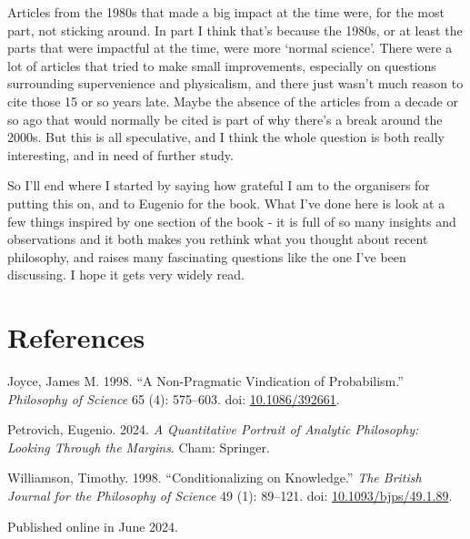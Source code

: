 \documentclass[
  11pt,
  letterpaper,
  DIV=11,
  numbers=noendperiod,
  twoside]{scrartcl}
\newlength{\cslhangindent}
\newenvironment{CSLReferences}[2] %
 {\begin{list}{}{%
  \setlength{\itemindent}{0pt}
  \setlength{\leftmargin}{0pt}
  \setlength{\parsep}{0pt}
  \ifodd #1
   \setlength{\leftmargin}{\cslhangindent}
   \setlength{\itemindent}{-1\cslhangindent}
  \fi
  \setlength{\itemsep}{#2\baselineskip}}}
 {\end{list}}
\begin{document}
\begin{longtable}[]{@{}
  >{\raggedright\arraybackslash}p{}
  >{\raggedleft\arraybackslash}p{}@{}}
\end{longtable}

Articles from the 1980s that made a big impact at the time were, for the
most part, not sticking around. In part I think that's because the
1980s, or at least the parts that were impactful at the time, were more
`normal science'. There were a lot of articles that tried to make small
improvements, especially on questions surrounding supervenience and
physicalism, and there just wasn't much reason to cite those 15 or so
years late. Maybe the absence of the articles from a decade or so ago
that would normally be cited is part of why there's a break around the
2000s. But this is all speculative, and I think the whole question is
both really interesting, and in need of further study.

So I'll end where I started by saying how grateful I am to the
organisers for putting this on, and to Eugenio for the book. What I've
done here is look at a few things inspired by one section of the book -
it is full of so many insights and observations and it both makes you
rethink what you thought about recent philosophy, and raises many
fascinating questions like the one I've been discussing. I hope it gets
very widely read.

\section*{References}\label{references}

\label{refs}
\begin{CSLReferences}{1}{0}
Joyce, James M. 1998. {``A Non-Pragmatic Vindication of Probabilism.''}
\emph{Philosophy of Science} 65 (4): 575--603. doi:
\href{https://doi.org/10.1086/392661}{10.1086/392661}.

Petrovich, Eugenio. 2024. \emph{A Quantitative Portrait of Analytic
Philosophy: Looking Through the Margins}. Cham: Springer.

Williamson, Timothy. 1998. {``Conditionalizing on Knowledge.''}
\emph{The British Journal for the Philosophy of Science} 49 (1):
89--121. doi:
\href{https://doi.org/10.1093/bjps/49.1.89}{10.1093/bjps/49.1.89}.

\end{CSLReferences}



\noindent Published online in June 2024.
\end{document}
